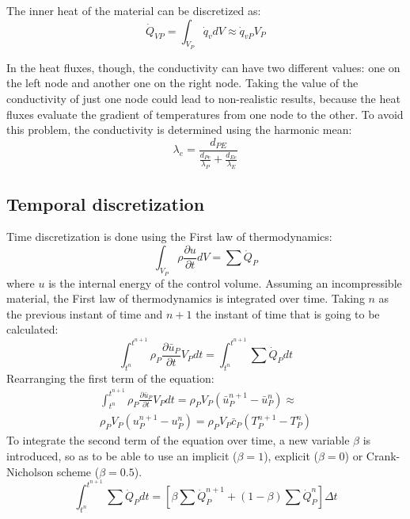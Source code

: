 The inner heat of the material can be discretized as:
\begin{equation}
\dot{Q}_{VP}=\int_{V_{P}}^{}\dot{q}_{v}dV\approx\dot{q}_{vP}V_{P}
\end{equation}

In the heat fluxes, though, the conductivity can have two different values: one on the left node and another one on the right node. Taking the value of the conductivity of just one node could lead to non-realistic results, because the heat fluxes evaluate the gradient of temperatures from one node to the other. To avoid this problem, the conductivity is determined using the harmonic mean:
\begin{equation}
\lambda_{e}=\frac{d_{PE}}{\frac{d_{Pe}}{\lambda_{P}}+\frac{d_{Ee}}{\lambda_{E}}}
\end{equation}

\subsection{Temporal discretization}
\label{TemporalDiscretizationConduction}
Time discretization is done using the First law of thermodynamics:
\begin{equation}
\int_{V_{P}}^{}\rho\frac{\partial u}{\partial t}dV=\sum\dot{Q}_{P}
\end{equation}
where $u$ is the internal energy of the control volume.
Assuming an incompressible material, the First law of thermodynamics is integrated over time. Taking $n$ as the previous instant of time and $n+1$ the instant of time that is going to be calculated:
\begin{equation}
\int_{t^{n}}^{t^{n+1}}\rho_{P}\frac{\partial\bar{u}_{P}}{\partial t}V_{P}dt=\int_{t^{n}}^{t^{n+1}}\sum\dot{Q}_{P}dt
\end{equation}
Rearranging the first term of the equation:
\begin{multline}
\int_{t^{n}}^{t^{n+1}}\rho_{P}\frac{\partial\bar{u}_{P}}{\partial t}V_{P}dt=\rho_{P}V_{P}\left(\bar{u}_{P}^{n+1}-\bar{u}_{P}^{n}\right)\approx \\
\rho_{P}V_{P}\left(u_{P}^{n+1}-u_{P}^{n}\right)=\rho_{P}V_{P}\bar{c}_{P}\left(T_{P}^{n+1}-T_{P}^{n}\right)
\end{multline}
To integrate the second term of the equation over time, a new variable $\beta$ is introduced, so as to be able to use an implicit ($\beta=1$), explicit ($\beta=0$) or Crank-Nicholson scheme ($\beta=0.5$).
\begin{equation}
\int_{t^{n}}^{t^{n+1}}\sum\dot{Q}_{P}dt=\left[\beta\sum\dot{Q}_{P}^{n+1}+\left(1-\beta\right)\sum\dot{Q}_{P}^{n}\right]\Delta t
\end{equation}

